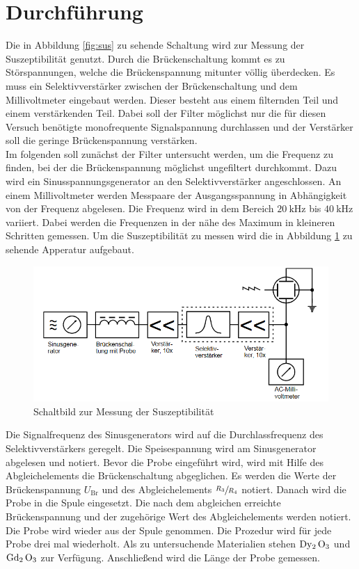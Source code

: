 \section{Durchführung}
\label{sec:Durchführung}
Die in Abbildung \ref{fig:sus} zu sehende Schaltung wird zur Messung der Suszeptibilität genutzt.
Durch die Brückenschaltung kommt es zu Störspannungen, welche die Brückenspannung mitunter völlig überdecken. Es muss ein Selektivverstärker zwischen der Brückenschaltung und dem Millivoltmeter eingebaut werden.
Dieser besteht aus einem filternden Teil und einem verstärkenden Teil. Dabei soll der Filter möglichst nur die für diesen Versuch benötigte monofrequente Signalspannung durchlassen und der Verstärker 
soll die geringe Brückenspannung verstärken.
\\
Im folgenden soll zunächst der Filter untersucht werden, um die Frequenz zu finden, bei der die Brückenspannung möglichst ungefiltert durchkommt.
Dazu wird ein Sinusspannungsgenerator an den Selektivverstärker angeschlossen. An einem Millivoltmeter werden Messpaare der Ausgangsspannung in Abhängigkeit von der
Frequenz abgelesen. Die Frequenz wird in dem Bereich $\SI{20}{\kilo \hertz}$ bis $\SI{40}{\kilo \hertz}$ variiert. Dabei werden die Frequenzen in der nähe des Maximum in kleineren Schritten gemessen.
Um die Suszeptibilität zu messen wird die in Abbildung \ref{fig:AU} zu sehende Apperatur aufgebaut.
\begin{figure}
    \centering
    \includegraphics[scale=0.4]{pics/AU.png}
    \caption{Schaltbild zur Messung der Suszeptibilität \cite{v606}}
    \label{fig:AU}
  \end{figure}
  Die Signalfrequenz des Sinusgenerators wird auf die Durchlassfrequenz des Selektivverstärkers geregelt. Die Speisespannung wird am Sinusgenerator abgelesen und notiert.
  Bevor die Probe eingeführt wird, wird mit Hilfe des Abgleichelements die Brückenschaltung abgeglichen. Es werden die Werte der Brückenspannung $U_\text{Br}$ und des Abgleichelements $\sfrac{R_3}{R_4}$ notiert.
  Danach wird die Probe in die Spule eingesetzt. Die nach dem abgleichen erreichte Brückenspannung und der zugehörige Wert des Abgleichelements werden notiert.
  Die Probe wird wieder aus der Spule genommen. Die Prozedur wird für jede Probe drei mal wiederholt. Als zu untersuchende Materialien stehen $\ce{Dy2 O3}$ und $\ce{Gd2 O3}$ zur Verfügung.
  Anschließend wird die Länge der Probe gemessen.